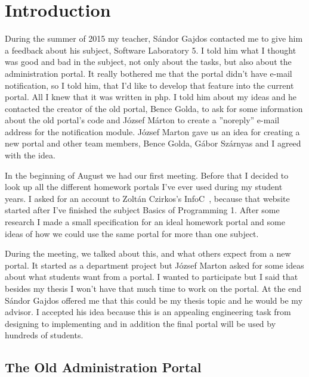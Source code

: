 \chapter{Introduction}

During the summer of 2015 my teacher, Sándor Gajdos contacted me to give him a feedback about his subject, Software Laboratory 5. I told him what I thought was good and bad in the subject, not only about the tasks, but also about the administration portal. It really bothered me that the portal didn't have e-mail notification, so I told him, that I'd like to develop that feature into the current portal. All I knew that it was written in php. I told him about my ideas and he contacted the creator of the old portal, Bence Golda, to ask for some information about the old portal's code and József Márton to create a ''noreply'' e-mail address for the notification module. József Marton gave us an idea for creating a new portal and other team members, Bence Golda, Gábor Szárnyas and I agreed with the idea. 

In the beginning of August we had our first meeting. Before that I decided to look up all the different homework portals I've ever used during my student years. I asked for an account to Zoltán Czirkos's InfoC~\cite{InfoC}, because that website started after I've finished the subject Basics of Programming 1. After some research I made a small specification for an ideal homework portal and some ideas of how we could use the same portal for more than one subject.

During the meeting, we talked about this, and what others expect from a new portal. It started as a department project but József Marton asked for some ideas about what students want from a portal. I wanted to participate but I said that besides my thesis I won't have that much time to work on the portal. At the end Sándor Gajdos offered me that this could be my thesis topic and he would be my advisor. I accepted his idea because this is an appealing engineering task from designing to implementing and in addition the final portal will be used by hundreds of students. 


\section{The Old Administration Portal} 

